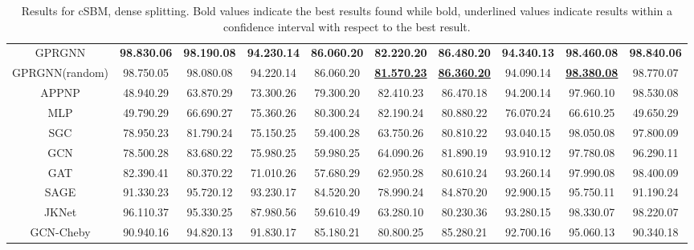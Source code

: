 \documentclass{article} \usepackage{iclr2021_conference,times}
\begin{document}
\begin{table}[ht]
\caption{Results for cSBM, dense splitting. Bold values indicate the best results found while bold, underlined values indicate results within a  confidence interval with respect to the best result.}
\label{tab:cSBM_dense}
\vspace{0.2cm}
\scriptsize
\begin{tabular}{@{}cccccccccc@{}}
\toprule
 &
   &
   &
   &
   &
   &
   &
   &
   &
   \\ \midrule
GPRGNN &
  \textbf{98.83\tiny{0.06}} &
  \textbf{98.19\tiny{0.08}} &
  \textbf{94.23\tiny{0.14}} &
  \textbf{86.06\tiny{0.20}} &
  \textbf{82.22\tiny{0.20}} &
  \textbf{86.48\tiny{0.20}} &
  \textbf{94.34\tiny{0.13}} &
  \textbf{98.46\tiny{0.08}} &
  \textbf{98.84\tiny{0.06}} \\
GPRGNN(random) &
  98.75\tiny{0.05} &
  98.08\tiny{0.08} &
  94.22\tiny{0.14} &
  86.06\tiny{0.20} &
  {\ul \textbf{81.57\tiny{0.23}}} &
  {\ul \textbf{86.36\tiny{0.20}}} &
  94.09\tiny{0.14} &
  {\ul \textbf{98.38\tiny{0.08}}} &
  98.77\tiny{0.07} \\
APPNP &
  48.94\tiny{0.29} &
  63.87\tiny{0.29} &
  73.30\tiny{0.26} &
  79.30\tiny{0.20} &
  82.41\tiny{0.23} &
  86.47\tiny{0.18} &
  94.20\tiny{0.14} &
  97.96\tiny{0.10} &
  98.53\tiny{0.08} \\
MLP &
  49.79\tiny{0.29} &
  66.69\tiny{0.27} &
  75.36\tiny{0.26} &
  80.30\tiny{0.24} &
  82.19\tiny{0.24} &
  80.88\tiny{0.22} &
  76.07\tiny{0.24} &
  66.61\tiny{0.25} &
  49.65\tiny{0.29} \\
SGC &
  78.95\tiny{0.23} &
  81.79\tiny{0.24} &
  75.15\tiny{0.25} &
  59.40\tiny{0.28} &
  63.75\tiny{0.26} &
  80.81\tiny{0.22} &
  93.04\tiny{0.15} &
  98.05\tiny{0.08} &
  97.80\tiny{0.09} \\
GCN &
  78.50\tiny{0.28} &
  83.68\tiny{0.22} &
  75.98\tiny{0.25} &
  59.98\tiny{0.25} &
  64.09\tiny{0.26} &
  81.89\tiny{0.19} &
  93.91\tiny{0.12} &
  97.78\tiny{0.08} &
  96.29\tiny{0.11} \\
GAT &
  82.39\tiny{0.41} &
  80.37\tiny{0.22} &
  71.01\tiny{0.26} &
  57.68\tiny{0.29} &
  62.95\tiny{0.28} &
  80.61\tiny{0.24} &
  93.26\tiny{0.14} &
  97.99\tiny{0.08} &
  98.40\tiny{0.09} \\
SAGE &
  91.33\tiny{0.23} &
  95.72\tiny{0.12} &
  93.23\tiny{0.17} &
  84.52\tiny{0.20} &
  78.99\tiny{0.24} &
  84.87\tiny{0.20} &
  92.90\tiny{0.15} &
  95.75\tiny{0.11} &
  91.19\tiny{0.24} \\
JKNet &
  96.11\tiny{0.37} &
  95.33\tiny{0.25} &
  87.98\tiny{0.56} &
  59.61\tiny{0.49} &
  63.28\tiny{0.10} &
  80.23\tiny{0.36} &
  93.28\tiny{0.15} &
  98.33\tiny{0.07} &
  98.22\tiny{0.07} \\
GCN-Cheby &
  90.94\tiny{0.16} &
  94.82\tiny{0.13} &
  91.83\tiny{0.17} &
  85.18\tiny{0.21} &
  80.80\tiny{0.25} &
  85.28\tiny{0.21} &
  92.70\tiny{0.16} &
  95.06\tiny{0.13} &
  90.34\tiny{0.18} \\ \bottomrule
\end{tabular}
\normalsize
\end{table}
\end{document}
